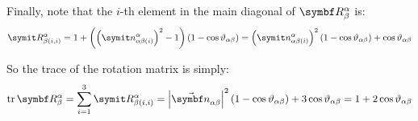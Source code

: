 Finally, note that the $i$-th element in the main diagonal of $\RotM{\alpha}{\beta}$ is:
\begin{equation*}
\cRotM{\alpha}{\beta}{i,i} = 1 + \rndp{ \rndp{\crelprj{\rotax}{\alpha}{\beta}{\alpha}{i}}^2 - 1} (1-\cos \rel{\rotang}{\alpha}{\beta}) = \rndp{\crelprj{\rotax}{\alpha}{\beta}{\alpha}{i}}^2 (1- \cos \rel{\rotang}{\alpha}{\beta}) + \cos \rel{\rotang}{\alpha}{\beta}
\end{equation*}

So the trace of the rotation matrix is simply:
\begin{equation} \label{E:AttRep.AxAng.Res.Tr}
\trace{\RotM{\alpha}{\beta}} = \sum^{3}_{i=1} \cRotM{\alpha}{\beta}{i,i}= \norm{\varel{\rotax}{\alpha}{\beta}}^2 (1-\cos \rel{\rotang}{\alpha}{\beta}) + 3 \cos \rel{\rotang}{\alpha}{\beta} = 1 + 2 \cos \rel{\rotang}{\alpha}{\beta}
\end{equation}

